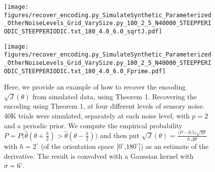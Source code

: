 \documentclass[si.tex]{subfiles}
\begin{document}
\begin{figure}[ht]
  \begin{minipage}[b]{0.45\textwidth}
    \centering
    \texttt{[image: figures/recover\_encoding.py\_SimulateSynthetic\_Parameterized\_OtherNoiseLevels\_Grid\_VarySize.py\_180\_2\_5\_N40000\_STEEPPERIODIC\_STEEPPERIODIC.txt\_180\_4.0\_6.0\_sqrtJ.pdf]}
  \end{minipage}
  \hfill
  \begin{minipage}[b]{0.45\textwidth}
    \centering
    \texttt{[image: figures/recover\_encoding.py\_SimulateSynthetic\_Parameterized\_OtherNoiseLevels\_Grid\_VarySize.py\_180\_2\_5\_N40000\_STEEPPERIODIC\_STEEPPERIODIC.txt\_180\_4.0\_6.0\_Fprime.pdf]}
  \end{minipage}



  \caption{
Here, we provide an example of how to recover the encoding $\sqrt{J}(\theta)$ from simulated data, using Theorem 1.
Recovering the encoding using Theorem 1, at four different levels of sensory noise. 40K trials were simulated, separately at each noise level, with $p=2$ and a periodic prior. We compute the empirical probability
$P=P\bigl(\hat{\theta}(\theta+\tfrac{h}{2})>\hat{\theta}(\theta-\tfrac{h}{2})\bigr)$ and then put
$\sqrt{J}(\theta)=\frac{\bigl(P-0.5\bigr)\sqrt{4\pi}}{h\,\Delta\theta}$ with $h=2^\circ$ (of the orientation space [$0^\circ$,$180^\circ$]) as an estimate of the derivative.
The result is convolved with a Gaussian kernel with $\sigma=6^\circ$.
}\label{fig:recover-encoding}
\end{figure}

\begin{comment}

python3 recover_encoding.py 180 4.0 6.0 SimulateSynthetic_Parameterized_OtherNoiseLevels_Grid_VarySize.py_180_2_2_N40000_STEEPPERIODIC_STEEPPERIODIC.txt
python3 recover_encoding.py 180 4.0 6.0 SimulateSynthetic_Parameterized_OtherNoiseLevels_Grid_VarySize.py_180_2_3_N40000_STEEPPERIODIC_STEEPPERIODIC.txt
python3 recover_encoding.py 180 4.0 6.0 SimulateSynthetic_Parameterized_OtherNoiseLevels_Grid_VarySize.py_180_2_4_N40000_STEEPPERIODIC_STEEPPERIODIC.txt
python3 recover_encoding.py 180 4.0 6.0 SimulateSynthetic_Parameterized_OtherNoiseLevels_Grid_VarySize.py_180_2_5_N40000_STEEPPERIODIC_STEEPPERIODIC.txt
\end{comment}
\end{document}
